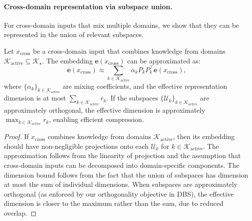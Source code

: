 \paragraph{Cross-domain representation via subspace union.}
For cross-domain inputs that mix multiple domains, we show that they can be represented in the union of relevant subspaces.

\begin{proposition}
\label{prop:cross_domain_union}
Let $x_{\mathrm{cross}}$ be a cross-domain input that combines knowledge from domains $\mathcal{K}_{\mathrm{active}} \subseteq \mathcal{K}_\star$.
The embedding $\mathbf{e}(x_{\mathrm{cross}})$ can be approximated as:
\begin{equation}
\mathbf{e}(x_{\mathrm{cross}}) \approx \sum_{k \in \mathcal{K}_{\mathrm{active}}} \alpha_k P_k P_k^\top \mathbf{e}(x_{\mathrm{cross}}),
\end{equation}
where $\{\alpha_k\}_{k \in \mathcal{K}_{\mathrm{active}}}$ are mixing coefficients, and the effective representation dimension is at most $\sum_{k \in \mathcal{K}_{\mathrm{active}}} r_k$.
If the subspaces $\{\mathcal{U}_k\}_{k \in \mathcal{K}_{\mathrm{active}}}$ are approximately orthogonal, the effective dimension is approximately $\max_{k \in \mathcal{K}_{\mathrm{active}}} r_k$, enabling efficient compression.
\end{proposition}

\begin{proof}
If $x_{\mathrm{cross}}$ combines knowledge from domains $\mathcal{K}_{\mathrm{active}}$, then its embedding should have non-negligible projections onto each $\mathcal{U}_k$ for $k \in \mathcal{K}_{\mathrm{active}}$.
The approximation follows from the linearity of projection and the assumption that cross-domain inputs can be decomposed into domain-specific components.
The dimension bound follows from the fact that the union of subspaces has dimension at most the sum of individual dimensions.
When subspaces are approximately orthogonal (as enforced by our orthogonality objective in DBS), the effective dimension is closer to the maximum rather than the sum, due to reduced overlap.
\end{proof}

